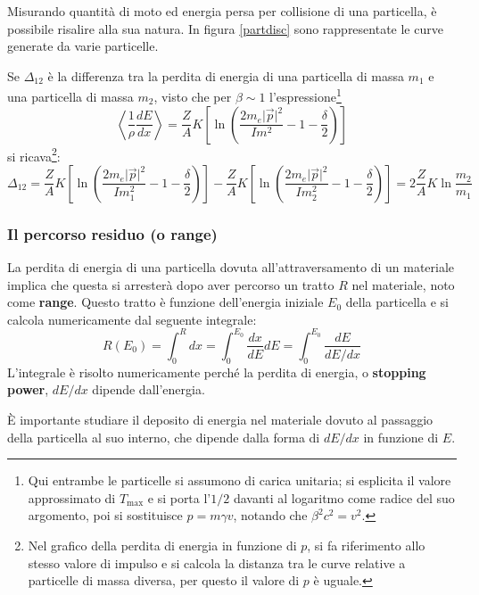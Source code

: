 \documentclass[10pt, a4paper]{scrartcl}
\numberwithin{equation}{subsection}
\theoremstyle{style1}
\begin{document}
Misurando quantit\`a di moto ed energia persa per collisione di una particella, \`e possibile risalire alla sua natura. In figura \ref{partdisc} sono rappresentate le curve generate da varie particelle.

Se $\Delta _{12} $ \`e la differenza tra la perdita di energia di una particella di massa $m_1$ e una particella di massa $m_2$, visto che per $\beta \sim 1$ l'espressione\footnote{Qui entrambe le particelle si assumono di carica unitaria; si esplicita il valore approssimato di $T_\text{max}$ e si porta l'$1 / 2 $ davanti al logaritmo come radice del suo argomento, poi si sostituisce $p = m \gamma v$, notando che $\beta ^2 c^2 = v^2$.}
\[
\left\langle \frac{1}{\rho } \frac{d E}{d x}  \right\rangle =  \frac{Z}{A} K \left[ \ln \left(\frac{2m _e \lvert \vec{p} \rvert ^2}{I m^2} - 1 - \frac{\delta }{2}\right)  \right] 
\] 
si ricava\footnote{Nel grafico della perdita di energia in funzione di $p$, si fa riferimento allo stesso valore di impulso e si calcola la distanza tra le curve relative a particelle di massa diversa, per questo il valore di $p$ \`e uguale.}:
\begin{equation}
	\Delta _{12}  =  \frac{Z}{A} K \left[ \ln \left(\frac{2m _e \lvert \vec{p} \rvert ^2}{I m_1^2} - 1 - \frac{\delta }{2}\right)  \right] -  \frac{Z}{A} K \left[ \ln \left(\frac{2m _e \lvert \vec{p} \rvert ^2}{I m_2^2} - 1 - \frac{\delta }{2}\right)  \right] = 2 \frac{Z}{A } K \ln \frac{m_2}{m_1}
\end{equation}
\subsubsection{Il percorso residuo (o range)}
La perdita di energia di una particella dovuta all'attraversamento di un materiale implica che questa si arrester\`a dopo aver percorso un tratto $R$ nel materiale, noto come \textbf{range}. Questo tratto \`e funzione dell'energia iniziale $E_0$ della particella e si calcola numericamente dal seguente integrale:
\begin{equation}
	R(E_0)  = \int_{0} ^R dx = \int_{0} ^{E_0} \frac{d x}{d E} dE	= \int_{0} ^{E_0}  \frac{dE}{dE / dx}
\end{equation}
L'integrale \`e risolto numericamente perch\'e la perdita di energia, o \textbf{stopping power}, $dE / dx $ dipende dall'energia.

\`E importante studiare il deposito di energia nel materiale dovuto al passaggio della particella al suo interno, che dipende dalla forma di $dE / dx$ in funzione di $E$.
\end{document}
